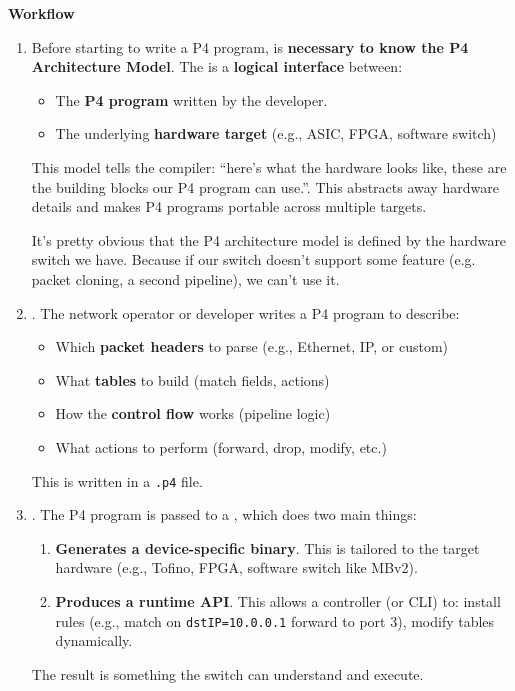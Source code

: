 \highspace
\begin{flushleft}
    \textcolor{Green3}{ \textbf{Workflow}}
\end{flushleft}
\begin{enumerate}
    \item Before starting to write a P4 program, is \textbf{necessary to know the P4 Architecture Model}. The  is a \textbf{logical interface} between:
    \begin{itemize}
        \item The \textbf{P4 program} written by the developer.
        \item The underlying \textbf{hardware target} (e.g., ASIC, FPGA, software switch)
    \end{itemize}
    This model tells the compiler: ``here's what the hardware looks like, these are the building blocks our P4 program can use.''. This abstracts away hardware details and makes P4 programs portable across multiple targets.

    It's pretty obvious that the P4 architecture model is defined by the hardware switch we have. Because if our switch doesn't support some feature (e.g. packet cloning, a second pipeline), we can't use it.


    \item {}. The network operator or developer writes a P4 program to describe:
    \begin{itemize}
        \item Which \textbf{packet headers} to parse (e.g., Ethernet, IP, or custom)
        \item What \textbf{tables} to build (match fields, actions)
        \item How the \textbf{control flow} works (pipeline logic)
        \item What actions to perform (forward, drop, modify, etc.)
    \end{itemize}
    This is written in a \texttt{.p4} file.

    
    \item {}. The P4 program is passed to a , which does two main things:
    \begin{enumerate}
        \item \textbf{Generates a device-specific binary}. This is tailored to the target hardware (e.g., Tofino, FPGA, software switch like MBv2).
        \item \textbf{Produces a runtime API}. This allows a controller (or CLI) to: install rules (e.g., match on \texttt{dstIP=10.0.0.1} forward to port 3), modify tables dynamically.
    \end{enumerate}
    The result is something the switch can understand and execute.



\end{enumerate}
